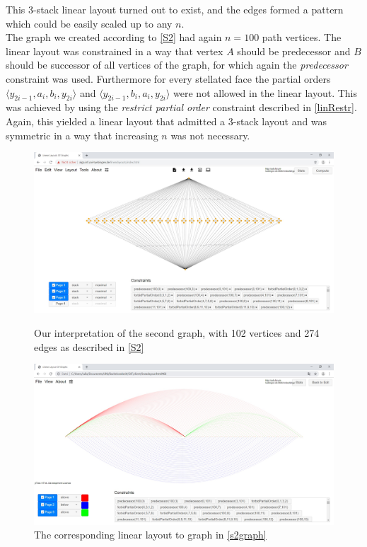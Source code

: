 \noindent This 3-stack linear layout turned out to exist, and the edges formed a pattern which could be easily scaled up to any $n$.\\[12pt]
The graph we created according to \autoref{S2} had again $n = 100$ path vertices. The linear layout was constrained in a way that vertex $A$ should be predecessor and $B$ should be successor of all vertices of the graph, for which again the \textit{predecessor} constraint was used. Furthermore for every stellated face the partial orders $\langle y_{2i-1}, a_i, b_i, y_{2i}\rangle$ and $\langle y_{2i-1}, b_i, a_i, y_{2i}\rangle$ were not allowed in the linear layout. This was achieved by using the \textit{restrict partial order} constraint described in \autoref{linRestr}.\\
Again, this yielded a linear layout that admitted a 3-stack layout and was symmetric in a way that increasing $n$ was not necessary.\\
\begin{figure}[h!]
\begin{center}
\includegraphics[width=1\textwidth]{figures/stellated-102-274.jpg}
\caption{Our interpretation of the second graph, with 102 vertices and 274 edges as described in \autoref{S2} \label{s2graph}}
\vspace*{24px}
\includegraphics[width=1\textwidth]{figures/stellated-102-274-Solution.jpg}
\caption{The corresponding linear layout to graph in \autoref{s2graph} \label{s2Sol}}
\end{center}
\end{figure}\\
